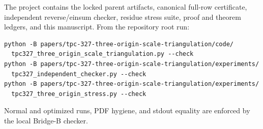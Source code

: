 \documentclass[10pt]{article}
\begin{document}
The project contains the locked parent artifacts, canonical full-row
certificate, independent reverse/einsum checker, residue stress suite, proof
and theorem ledgers, and this manuscript.  From the repository root run:
\begin{verbatim}
python -B papers/tpc-327-three-origin-scale-triangulation/code/
  tpc327_three_origin_scale_triangulation.py --check
python -B papers/tpc-327-three-origin-scale-triangulation/experiments/
  tpc327_independent_checker.py --check
python -B papers/tpc-327-three-origin-scale-triangulation/experiments/
  tpc327_three_origin_stress.py --check
\end{verbatim}
Normal and optimized runs, PDF hygiene, and stdout equality are enforced by
the local Bridge-B checker.



\end{document}
